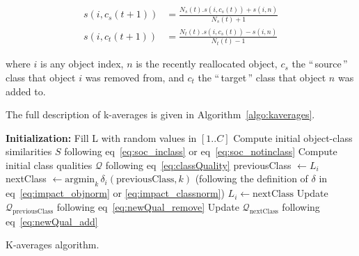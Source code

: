 \documentclass[a4paper,twoside]{article}
\newcommand{\gl}[1]{``\,#1\,''} %
\begin{document}

\begin{equation}
	\begin{aligned}
    s(i, c_s(t+1)) &= \frac{N_s(t).s(i, c_s(t)) + s(i,n)}{N_s(t)+1} \\
    s(i, c_t(t+1)) &= \frac{N_t(t).s(i, c_s(t)) - s(i,n)}{N_t(t)-1}
   	\end{aligned}
  \label{eq:newSimilNewC}
\end{equation}

\noindent where $i$ is any object index, $n$ is the recently reallocated object, $c_s$ the \gl{source} class that object $i$ was removed from, and $c_t$ the \gl{target} class that object $n$ was added to.

The full description of k-averages is given in Algorithm~\ref{algo:kaverages}.

\begin{algorithm}
	\label{algo:kaverages}
	\SetAlgoLined
	\BlankLine	
	\textbf{Initialization:}
		Fill L with random values in $[1..C]$\;
		Compute initial object-class similarities $S$ following eq~\ref{eq:soc_inclass} or eq~\ref{eq:soc_notinclass}\;
		Compute initial class qualities $\mathcal{Q}$ following eq~\ref{eq:classQuality}\;
	\BlankLine	
	 {
		 {
			previousClass $\leftarrow L_i$\;
			nextClass $\leftarrow \mathrm{argmin}_k\,\delta_i(\mathrm{previousClass}, k)$ \label{algline:kaverages_search}
			(following the definition of $\delta$ in eq~\ref{eq:impact_objnorm} or \ref{eq:impact_classnorm})\;
			 {
				$L_i \leftarrow \mathrm{nextClass}$\;
				Update $\mathcal{Q}_\mathrm{previousClass}$ following eq~\ref{eq:newQual_remove}\;
				Update $\mathcal{Q}_\mathrm{nextClass}$ following eq~\ref{eq:newQual_add}\;
			}
		}
	}
	\BlankLine
	\caption{K-averages algorithm.}
\end{algorithm}
\end{document}

